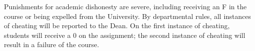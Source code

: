 \documentclass{article}
\begin{document}
Punishments for academic dishonesty are severe, including receiving an F in the course or being expelled from the University. By departmental rules, all instances of cheating will be reported to the Dean. On the first instance of cheating, students will receive a 0 on the assignment; the second instance of cheating will result in a failure of the course. 
\end{document}
